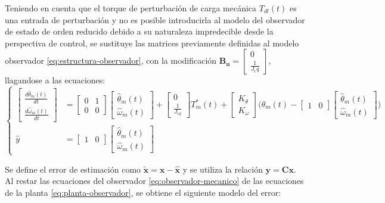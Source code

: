 \documentclass[blue,fullpaper]{ludusofficial}  %
\begin{document}
Teniendo en cuenta que el torque de perturbación de carga mecánica $T_{dl}(t)$ es una entrada de perturbación y no es posible introducirla al modelo del observador de estado de orden reducido debido a su naturaleza impredecible desde la perspectiva de control, se sustituye las matrices previamente definidas al modelo observador \eqref{eq:estructura-observador}, con la modificación $\mathbf{B_u}=\begin{bmatrix} 0 \\ \frac{1}{J_eq} \end{bmatrix}$, llagandose a las ecuaciones:
\begin{equation}
\label{eq:observador-mecanico}
\left\{
\begin{aligned}
\begin{bmatrix} \frac{d \hat{\theta}_{m}(t) }{dt} \\ \frac{d \hat{\omega}_{m}(t) }{dt}  \end{bmatrix} 
 & = \begin{bmatrix} 0 & 1 \\0 & 0 \end{bmatrix} \begin{bmatrix} \hat{\theta}_{m}(t) \\ \hat{\omega}_{m}(t) \end{bmatrix} + \begin{bmatrix} 0 \\ \frac{1}{J_{eq}} \end{bmatrix} T^{*}_{m}(t) + \begin{bmatrix} K_{\theta} \\ K_{\omega} \end{bmatrix} \Bigg( \theta_{m}(t) - \begin{bmatrix} 1 & 0 \end{bmatrix} \begin{bmatrix} \hat{\theta}_{m}(t) \\ \hat{\omega}_{m}(t) \end{bmatrix} \Bigg) \\
\hat{y} & = \begin{bmatrix} 1 & 0 \end{bmatrix} \begin{bmatrix} \hat{\theta}_{m}(t) \\ \hat{\omega}_{m}(t) \end{bmatrix}
\end{aligned}
\right.
\end{equation}

Se define el error de estimación como $\mathbf{\tilde{x}}=\mathbf{x}-\mathbf{\hat{x}}$ y se utiliza la relación $\mathbf{y} = \mathbf{C}\mathbf{x}$. Al restar las ecuaciones del observador \eqref{eq:observador-mecanico} %
de las ecuaciones de la planta \eqref{eq:planta-observador}, %
se obtiene el siguiente modelo del error:
\end{document}

